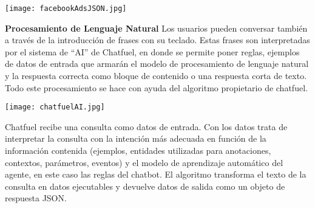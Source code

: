 \texttt{[image: facebookAdsJSON.jpg]}

\textbf{Procesamiento de Lenguaje Natural}
Los usuarios pueden conversar también a través de la introducción de frases con su teclado. Estas frases son interpretadas por el sistema de “AI” de Chatfuel, en donde se permite poner reglas, ejemplos de datos de entrada que armarán el modelo de procesamiento de lenguaje natural y la respuesta correcta como bloque de contenido o una respuesta corta de texto. Todo este procesamiento se hace con ayuda del algoritmo propietario de chatfuel.

\texttt{[image: chatfuelAI.jpg]}

Chatfuel recibe una consulta como datos de entrada. Con los datos trata de interpretar la consulta con la intención más adecuada en función de la información contenida (ejemplos, entidades utilizadas para anotaciones, contextos, parámetros, eventos) y el modelo de aprendizaje automático del agente, en este caso las reglas del chatbot. El algoritmo transforma el texto de la consulta en datos ejecutables y devuelve datos de salida como un objeto de respuesta JSON.

